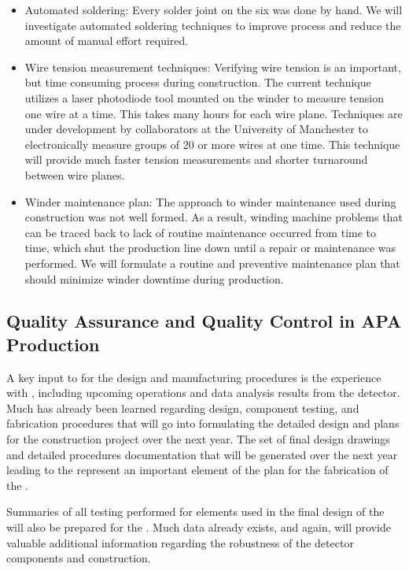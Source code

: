 \begin{itemize}
\item Automated soldering: Every solder joint on the six   was done by hand. We will investigate automated soldering techniques to improve process and reduce the amount of manual effort required. 

\item Wire tension measurement techniques: Verifying wire tension is an important, but time consuming process during construction. The current technique utilizes a laser photodiode tool mounted on the winder to measure tension one wire at a time. This takes many hours for each wire plane. Techniques are under development by collaborators at the University of Manchester  to electronically measure groups of \num{20} or more wires at one time. This technique will provide much faster tension measurements and shorter turnaround between wire planes. 

\item Winder maintenance plan: The approach to winder maintenance used during  construction was not well formed. As a result, winding machine problems that can be traced back to lack of routine maintenance occurred from time to time, which shut the production line down until a repair or maintenance was performed. We will formulate a routine and preventive maintenance plan that should minimize winder downtime during  production.
\end{itemize}


\subsection{Quality Assurance and Quality Control in APA Production}
\label{sec:fdsp-apa-qa}

A key input to  for the  design and manufacturing procedures is the experience with , including upcoming operations and data analysis results from the detector.  Much has already been learned regarding design, component testing, and fabrication procedures that will go into formulating the detailed design and plans for the %
 construction project over the next year.  The set of final design drawings and detailed procedures documentation that will be generated over the next year leading to the  represent an important element of the  plan for the fabrication of the .  

Summaries of all  testing performed for elements used in the final design of the  will also be prepared for the .  Much data already exists, and again,  will provide valuable additional information regarding the robustness of the detector components and construction.  

